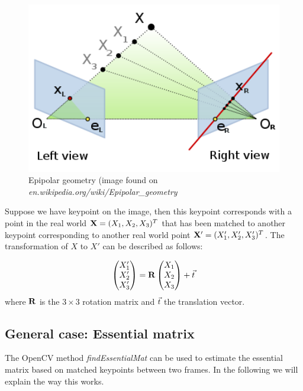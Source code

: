 \begin{figure}
    \centering
    \includegraphics[width=1\textwidth]{figures/epipolar_geometry.png}
    \caption{Epipolar geometry (image found on \textit{en.wikipedia.org/wiki/Epipolar\_geometry}}
    \label{fig:epigeo}
\end{figure}

Suppose we have keypoint on the image, then this keypoint corresponds with a point in the real world $\mathbf{X} = (X_1, X_2, X_3)^T$ that has been matched to another keypoint corresponding to another real world point $\mathbf{X}' = (X_1', X_2', X_3')^T$. The transformation of $X$ to $X'$ can be described as follows: 

\begin{equation} \label{eq:1}
    \begin{pmatrix}
        X_1' \\
        X_2' \\
        X_3'
    \end{pmatrix}
    = \mathbf{R}
    \begin{pmatrix}
        X_1 \\
        X_2 \\
        X_3
    \end{pmatrix}
    + \vec t
\end{equation}
where $\mathbf{R}$ is the $3 \times 3$ rotation matrix and $\vec t$ the translation vector.

\subsection{General case: Essential matrix}\label{ssec:essentialmat}
The OpenCV method \textit{findEssentialMat} can be used to estimate the essential matrix based on matched keypoints between two frames. In the following we will explain the way this works.\bigskip

